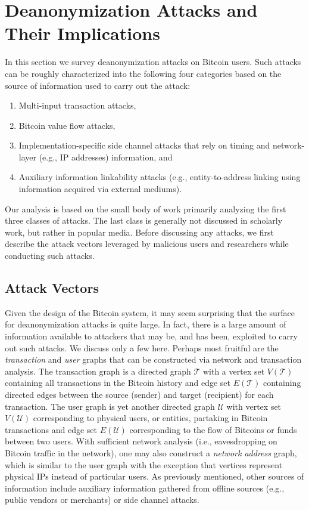 \section{Deanonymization Attacks and Their Implications}
In this section we survey deanonymization attacks on Bitcoin users. Such attacks can be roughly characterized into the following four categories based on the source of information used to carry out the attack:
\begin{enumerate}
	\item Multi-input transaction attacks,
	\item Bitcoin value flow attacks,
	\item Implementation-specific side channel attacks that rely on timing and network-layer (e.g., IP addresses) information, and
	\item Auxiliary information linkability attacks (e.g., entity-to-address linking using information acquired via external mediums).
\end{enumerate}
Our analysis is based on the small body of work primarily analyzing the first three classes of attacks. The last class is generally not discussed in scholarly work, but rather in popular media. Before discussing any attacks, we first describe the attack vectors leveraged by malicious users and researchers while conducting such attacks.

\subsection{Attack Vectors} \label{sec:vectors}
Given the design of the Bitcoin system, it may seem surprising that the surface for deanonymization attacks is quite large. In fact, there is a large amount of information available to attackers that may be, and has been, exploited to carry out such attacks. We discuss only a few here. Perhaps most fruitful are the \emph{transaction} and \emph{user} graphs that can be constructed via network and transaction analysis. The transaction graph is a directed graph $\mathcal{T}$ with a vertex set $V(\mathcal{T})$ containing all transactions in the Bitcoin history and edge set $E(\mathcal{T})$ containing directed edges between the source (sender) and target (recipient) for each transaction. The user graph is yet another directed graph $\mathcal{U}$ with vertex set $V(\mathcal{U})$ corresponding to physical users, or entities, partaking in Bitcoin transactions and edge set $E(\mathcal{U})$ corresponding to the flow of Bitcoins or funds between two users. With sufficient network analysis (i.e., eavesdropping on Bitcoin traffic in the network), one may also construct a \emph{network address} graph, which is similar to the user graph with the exception that vertices represent physical IPs instead of particular users. As previously mentioned, other sources of information include auxiliary information gathered from offline sources (e.g., public vendors or merchants) or side channel attacks.


